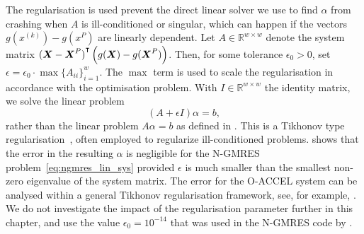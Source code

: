 \documentclass[main.tex]{subfiles}
\begin{document}
The regularisation is used prevent the direct linear solver we use to
find $\alpha$ from crashing when $A$ is ill-conditioned or singular,
which can happen if the vectors $g(x^{(k)})-g(x^P)$ are linearly
dependent.  Let $A\in\mathbb R^{w\times w}$ denote the system matrix
${(\boldsymbol{X}-\boldsymbol{X}^P)}^\intercal\left(
  g(\boldsymbol{X})-g(\boldsymbol{X}^P) \right)$.  Then, for some
tolerance $\epsilon_0>0$, set
$\epsilon=\epsilon_0\cdot\max{\{A_{ii}\}}_{i=1}^w$. The $\max$ term is
used to scale the regularisation in accordance with the optimisation
problem.  With $I\in\mathbb{R}^{w\times w}$ the identity matrix, we
solve the linear problem
\begin{equation}
  (A+\epsilon I)\alpha = b,
\end{equation}
rather than the linear problem $A\alpha=b$ as defined in
.  This is a Tikhonov type
regularisation~\cite{neumaier1998solving}, often employed to
regularize ill-conditioned problems.  \citet{washio1997krylov} shows
that the error in the resulting $\alpha$ is negligible for the N-GMRES
problem~\eqref{eq:ngmres_lin_sys} provided $\epsilon$ is much smaller
than the smallest non-zero eigenvalue of the system matrix.  The error
for the O-ACCEL system can be analysed within a general Tikhonov
regularisation framework, see, for example,
\citet{neumaier1998solving}. We do not investigate the impact of the
regularisation parameter further in this chapter, and use the value
$\epsilon_0=10^{-14}$ that was used in the N-GMRES code by
\citet{sterck2013steepest}.
\end{document}
